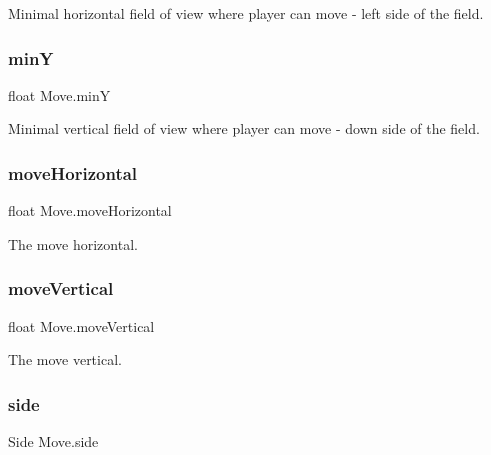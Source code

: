 Minimal horizontal field of view where player can move -\/ left side of the field. 

\mbox{\label{class_move_ac39298eb08947581f3308d499bd4b5cf}} 
\subsubsection{\texorpdfstring{minY}{minY}}
{\footnotesize\ttfamily float Move.\+minY\hspace{0.3cm}{\ttfamily [private]}}



Minimal vertical field of view where player can move -\/ down side of the field. 

\mbox{\label{class_move_a2777ede3b7fbfd425deb04fe8fd69791}} 
\subsubsection{\texorpdfstring{move\+Horizontal}{moveHorizontal}}
{\footnotesize\ttfamily float Move.\+move\+Horizontal}



The move horizontal. 

\mbox{\label{class_move_a248dd0919f2777f32c019ca10c342629}} 
\subsubsection{\texorpdfstring{move\+Vertical}{moveVertical}}
{\footnotesize\ttfamily float Move.\+move\+Vertical}



The move vertical. 

\mbox{\label{class_move_a0cf32cb803f7b4783a49ea55c9746dba}} 
\subsubsection{\texorpdfstring{side}{side}}
{\footnotesize\ttfamily Side Move.\+side}



